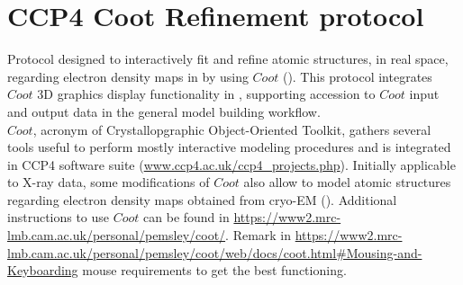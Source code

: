 \section{CCP4 Coot Refinement protocol}
\label{app:ccp4CootRefinement}%
Protocol designed to interactively fit and refine atomic structures, in real space, regarding electron density maps in \scipion by using $Coot$ (\citep{emsley2010}). This protocol integrates $Coot$ 3D graphics display functionality in \scipion, supporting accession to $Coot$ input and output data in the general model building workflow.\\$Coot$, acronym of Crystallopgraphic Object-Oriented Toolkit, gathers several tools useful to perform mostly interactive modeling procedures and is integrated in CCP4 software suite (\url{www.ccp4.ac.uk/ccp4\_projects.php}). Initially applicable to X-ray data, some modifications of $Coot$ also allow to model atomic structures regarding electron density maps obtained from cryo-EM (\citep{brown2015}). Additional instructions to use $Coot$ can be found in \url{https://www2.mrc-lmb.cam.ac.uk/personal/pemsley/coot/}. Remark in \url{https://www2.mrc-lmb.cam.ac.uk/personal/pemsley/coot/web/docs/coot.html#Mousing-and-Keyboarding} mouse requirements to get the \coot best functioning.\\

